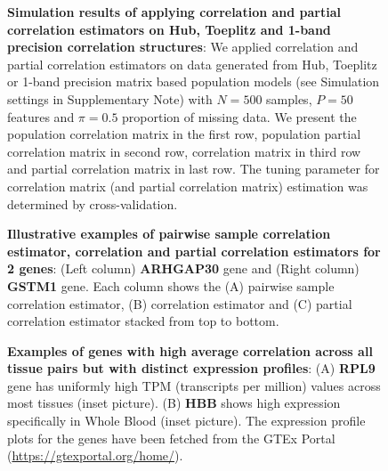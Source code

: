 \newpage

\begin{figure}[h!]
\centering
{}
\caption{\small {\textbf{Simulation results of applying \Robocov{} correlation and partial correlation estimators on Hub, Toeplitz and 1-band precision correlation structures}: We applied \Robocov{} correlation and partial correlation estimators on data generated from Hub, Toeplitz or 1-band precision matrix based population models (see Simulation settings in Supplementary Note) with $N=500$ samples, $P=50$ features and $\pi=0.5$ proportion of missing data. We present the population correlation matrix in the first row, population partial correlation matrix in second row, \Robocov{} correlation matrix in third row and \Robocov{} partial correlation matrix in last row. The tuning parameter for \Robocov{} correlation matrix (and partial correlation matrix) estimation was determined by cross-validation.}}
\label{fig:sim_results}
\end{figure}

\newpage
\begin{figure}[h!]
\centering
{}
\caption{\small {\textbf{Illustrative examples of pairwise sample correlation estimator, \Robocov{} correlation and partial correlation estimators for 2 genes}:
(Left column)  \textbf{ARHGAP30} gene and (Right column) \textbf{GSTM1} gene. Each column shows the (A) pairwise sample correlation estimator, (B) \Robocov{} correlation estimator and  (C) partial correlation estimator stacked from top to bottom.}}
\label{fig:gtex_demo}
\end{figure}


\newpage
\begin{figure}[h!]
\centering
{}
\caption{\small {\textbf{Examples of genes with high average \Robocov{} correlation across all tissue pairs but with distinct expression profiles}: (A) \textbf{RPL9} gene has uniformly high TPM (transcripts per million) values across most tissues (inset picture). (B) \textbf{HBB} shows high expression specifically in Whole Blood (inset picture). The expression profile plots for the genes have been fetched from the GTEx Portal (\url{https://gtexportal.org/home/}).}}
\label{fig:gtex_examples_main}
\end{figure}

